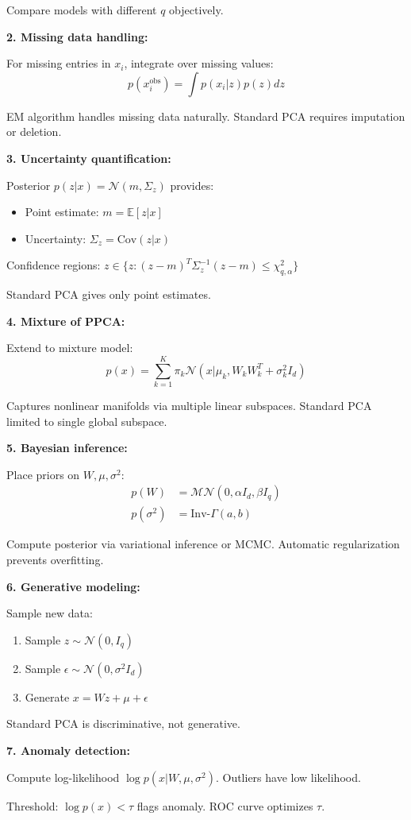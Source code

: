 \documentclass[12pt]{article}
\begin{document}
\begin{solution}
Compare models with different $q$ objectively.

\textbf{2. Missing data handling:}

For missing entries in $x_i$, integrate over missing values:
\[
p(x_i^{\text{obs}}) = \int p(x_i | z)p(z) dz
\]

EM algorithm handles missing data naturally. Standard PCA requires imputation or deletion.

\textbf{3. Uncertainty quantification:}

Posterior $p(z|x) = \mathcal{N}(m, \Sigma_z)$ provides:
\begin{itemize}
    \item Point estimate: $m = \mathbb{E}[z|x]$
    \item Uncertainty: $\Sigma_z = \text{Cov}(z|x)$
\end{itemize}

Confidence regions: $z \in \{z: (z-m)^T\Sigma_z^{-1}(z-m) \leq \chi^2_{q,\alpha}\}$

Standard PCA gives only point estimates.

\textbf{4. Mixture of PPCA:}

Extend to mixture model:
\[
p(x) = \sum_{k=1}^K \pi_k \mathcal{N}(x | \mu_k, W_kW_k^T + \sigma_k^2I_d)
\]

Captures nonlinear manifolds via multiple linear subspaces. Standard PCA limited to single global subspace.

\textbf{5. Bayesian inference:}

Place priors on $W, \mu, \sigma^2$:
\begin{align*}
p(W) &= \mathcal{MN}(0, \alpha I_d, \beta I_q) \\
p(\sigma^2) &= \text{Inv-}\Gamma(a, b)
\end{align*}

Compute posterior via variational inference or MCMC. Automatic regularization prevents overfitting.

\textbf{6. Generative modeling:}

Sample new data:
\begin{enumerate}
    \item Sample $z \sim \mathcal{N}(0, I_q)$
    \item Sample $\epsilon \sim \mathcal{N}(0, \sigma^2 I_d)$
    \item Generate $x = Wz + \mu + \epsilon$
\end{enumerate}

Standard PCA is discriminative, not generative.

\textbf{7. Anomaly detection:}

Compute log-likelihood $\log p(x | W, \mu, \sigma^2)$. Outliers have low likelihood.

Threshold: $\log p(x) < \tau$ flags anomaly. ROC curve optimizes $\tau$.


\end{solution}
\end{document}
